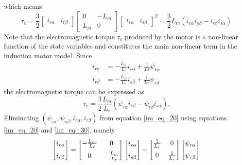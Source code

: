 \documentclass[11pt,a4paper,oneside]{book}
\numberwithin{equation}{section}
\theoremstyle{it}
\theoremstyle{definition}
\begin{document}
which means 
\begin{equation}\label{im_eq_29}
	\tau_e = 
	\frac{3}{2}\left[\begin{matrix}
		i_{r\alpha} & i_{r\beta}
	\end{matrix}\right]
	\left[\begin{matrix}
		0 & -L_m \\
		L_m & 0
	\end{matrix}\right]
	\left[\begin{matrix}
		i_{s\alpha} & i_{s\beta}
	\end{matrix}\right]^T = 
	\frac{3}{2}L_m\left(i_{r\alpha} i_{s\beta} - i_{r\beta} i_{s\alpha}\right)
\end{equation}
Note that the electromagnetic torque $\tau_e$ produced by the motor is a 
non-linear function of the state variables and constitutes the main non-linear 
term in the induction motor model. Since
\begin{equation}\label{im_eq_30}
	\begin{aligned}
		i_{r\alpha} &= -\frac{L_m}{L_r}i_{s\alpha}+\frac{1}{Lr}\psi_{r\alpha} 
		\\[8pt]
		i_{r\beta} &= -\frac{L_m}{L_r}i_{s\beta}+\frac{1}{Lr}\psi_{r\beta}
	\end{aligned}
\end{equation}
the electromagnetic torque can be expressed as
\begin{equation}\label{im_eq_31}
	\tau_{e} = 
	\frac{3}{2}\frac{L_m}{L_r}\left(\psi_{r\alpha}i_{s\beta}-\psi_{r\beta}i_{s\alpha}\right).
\end{equation}
Eliminating $\left(\psi_{s\alpha}, \psi_{s\beta}, i_{r\alpha}, 
i_{r\beta}\right)$ from equation  \ref{im_eq_20} using equations \ref{im_eq_20} 
and \ref{im_eq_30}, namely
\begin{equation}\label{im_eq_32}
	\left[\begin{matrix}
		i_{r\alpha} \\[6pt]
		i_{r\beta}
	\end{matrix}\right] = 
	\left[\begin{matrix}
		-\frac{L_m}{L_r} & 0 \\[6pt]
		0 & -\frac{L_m}{L_r}
	\end{matrix}\right]
	\left[\begin{matrix}
		i_{s\alpha} \\[6pt]
		i_{s\beta}
	\end{matrix}\right]+
	\left[\begin{matrix}
		\frac{1}{L_r} & 0 \\[6pt]
		0 & \frac{1}{L_r}
	\end{matrix}\right]
	\left[\begin{matrix}
		\psi_{r\alpha} \\[6pt]
		\psi_{r\beta}
	\end{matrix}\right]\\[6pt]
\end{equation}
\end{document}

